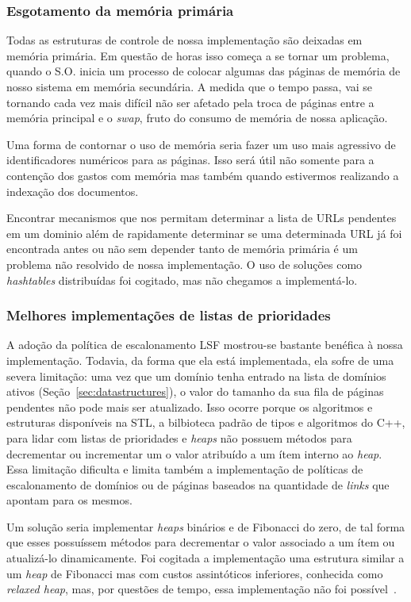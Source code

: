 \documentclass[10pt,twocolumn]{article}
\begin{document}
\subsubsection{Esgotamento da memória primária}

Todas as estruturas de controle de nossa implementação são deixadas em
memória primária. Em questão de horas isso começa a se tornar um
problema, quando o S.O. inicia um processo de colocar algumas das
páginas de memória de nosso sistema em  memória secundária. A medida que
o tempo passa, vai se tornando cada vez mais difícil não ser afetado
pela troca de páginas entre a memória principal e o \emph{swap}, fruto
do consumo de memória de nossa aplicação.

Uma forma de contornar o uso de memória seria fazer um uso mais
agressivo de identificadores numéricos para as páginas. Isso será útil
não somente para a contenção dos gastos com memória mas também quando
estivermos realizando a indexação dos documentos.

Encontrar mecanismos que nos permitam determinar a lista de URLs
pendentes em um dominio além de rapidamente determinar se uma
determinada URL já foi encontrada antes ou não sem depender tanto de
memória primária é um problema não resolvido de nossa implementação.
O uso de soluções como \emph{hashtables} distribuídas foi cogitado, mas
não chegamos a implementá-lo.

\subsubsection{Melhores implementações de listas de prioridades}

A adoção da política de escalonamento LSF mostrou-se bastante benéfica à
nossa implementação. Todavia, da forma que ela está implementada, ela
sofre de uma severa limitação: uma vez que um domínio tenha entrado na
lista de domínios ativos (Seção~\ref{sec:datastructures}), o valor do
tamanho da sua fila de páginas pendentes não pode mais ser atualizado.
Isso ocorre porque os algoritmos e estruturas disponíveis na STL, a
bilbioteca padrão de tipos e algoritmos do C++, para lidar com listas de
prioridades e \emph{heaps} não possuem métodos para decrementar ou
incrementar um o valor atribuído a um ítem interno ao \emph{heap}. Essa
limitação dificulta e limita também a implementação de políticas de
escalonamento de domínios ou de páginas baseados na quantidade de
\emph{links} que apontam para os mesmos.

Um solução seria implementar \emph{heaps} binários e de Fibonacci do
zero, de tal forma que esses possuíssem métodos para decrementar o valor
associado a um ítem ou atualizá-lo dinamicamente. Foi cogitada a
implementação uma estrutura similar a um \emph{heap} de Fibonacci mas
com custos assintóticos inferiores, conhecida como \emph{relaxed heap},
mas, por questões de tempo, essa implementação não foi
possível~\cite{driscoll1988relaxed}.
\end{document}
